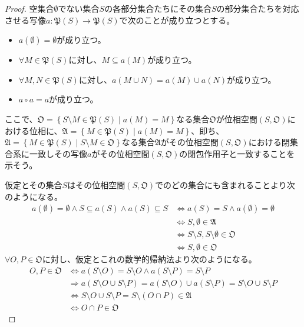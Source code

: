 \documentclass[dvipdfmx]{jsarticle}
\begin{document}
\begin{proof}
空集合$\emptyset$でない集合$S$の各部分集合たちにその集合$S$の部分集合たちを対応させる写像$a:\mathfrak{P}(S)\mathfrak{\rightarrow P}(S)$で次のことが成り立つとする。
\begin{itemize}
\item
  $a(\emptyset) = \emptyset$が成り立つ。
\item
  $\forall M \in \mathfrak{P}(S)$に対し、$M \subseteq a(M)$が成り立つ。
\item
  $\forall M,N \in \mathfrak{P}(S)$に対し、$a(M \cup N) = a(M) \cup a(N)$が成り立つ。
\item
  $a \circ a = a$が成り立つ。
\end{itemize}\par
ここで、$\mathfrak{O}=\left\{ S \setminus M \in \mathfrak{P}(S) \middle| a(M) = M \right\}$なる集合$\mathfrak{O}$が位相空間$\left( S,\mathfrak{O} \right)$における位相に、$\mathfrak{A} =\left\{ M \in \mathfrak{P}(S) \middle| a(M) = M \right\}$、即ち、$\mathfrak{A }=\left\{ M \in \mathfrak{P}(S) \middle| S \setminus M \in \mathfrak{O} \right\}$なる集合$\mathfrak{A}$がその位相空間$\left( S,\mathfrak{O} \right)$における閉集合系に一致しその写像$a$がその位相空間$\left( S,\mathfrak{O} \right)$の閉包作用子と一致することを示そう。\par
仮定とその集合$S$はその位相空間$\left( S,\mathfrak{O} \right)$でのどの集合にも含まれることより次のようになる。
\begin{align*}
a(\emptyset) = \emptyset \land S \subseteq a(S) \land a(S) \subseteq S &\Leftrightarrow a(S) = S \land a(\emptyset) = \emptyset\\
&\Leftrightarrow S,\emptyset \in \mathfrak{A}\\
&\Leftrightarrow S \setminus S,S \setminus \emptyset \in \mathfrak{O}\\
&\Leftrightarrow S,\emptyset \in \mathfrak{O}
\end{align*}
$\forall O,P \in \mathfrak{O}$に対し、仮定とこれの数学的帰納法より次のようになる。
\begin{align*}
O,P \in \mathfrak{O} &\Leftrightarrow a(S \setminus O) = S \setminus O \land a(S \setminus P) = S \setminus P\\
&\Rightarrow a(S \setminus O \cup S \setminus P) = a(S \setminus O) \cup a\left( S\setminus P \right) = S \setminus O \cup S \setminus P\\
&\Leftrightarrow S \setminus O \cup S \setminus P = S \setminus (O \cap P)\in \mathfrak{A}\\
&\Leftrightarrow O \cap P \in \mathfrak{O}

\end{align*}
\end{proof}
\end{document}
